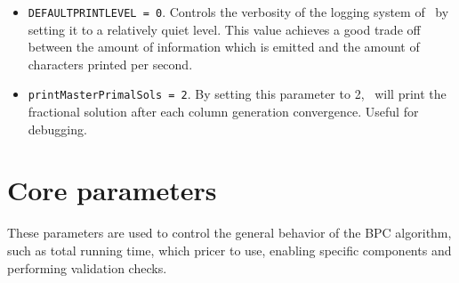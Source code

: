 \begin{itemize}
	\item \texttt{DEFAULTPRINTLEVEL = 0}.
	      Controls the verbosity of the logging system of \bapcod\ by setting it to a relatively quiet level.
	      This value achieves a good trade off between the amount of information which is emitted
	      and the amount of characters printed per second.
	\item \texttt{printMasterPrimalSols = 2}.
	      By setting this parameter to 2, \bapcod\ will print the fractional solution after each column generation convergence.
	      Useful for debugging.
\end{itemize}

\section{Core parameters}
These parameters are used to control the general behavior of the BPC algorithm,
such as total running time, which pricer to use, enabling specific
components and performing validation checks.

